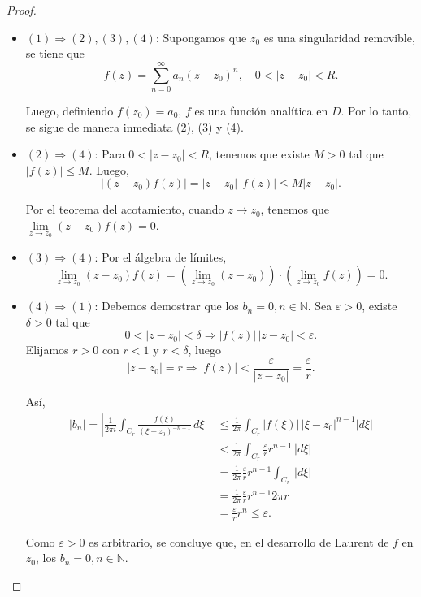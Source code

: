 \begin{proof}
\ 

\begin{itemize}
    \item  $(1) \Rightarrow (2), (3), (4)$: Supongamos que $z_0$ es una singularidad removible, se tiene que
    $$f(z) = \sum_{n=0}^{\infty} a_n (z-z_0)^n, \quad 0 < |z-z_0| < R.$$
    
    Luego, definiendo $f(z_0) = a_0$, $f$ es una función analítica en $D$. Por lo tanto, se sigue de manera inmediata (2), (3) y (4).
    
    \item $(2) \Rightarrow (4)$: Para  $0 < |z-z_0| < R$, tenemos que existe $M > 0$ tal que $|f(z)| \leq M $. Luego,
    $$|(z-z_0) f(z)| = |z-z_0| \,|f(z)| \leq M |z-z_0|.$$
    
    Por el teorema del acotamiento, cuando $z \to z_0$, tenemos que $\lim\limits_{z\to z_0} (z-z_0) f(z) = 0$.
    
    \item $(3) \Rightarrow (4)$: Por el álgebra de límites,
    $$\lim_{z\to z_0} (z-z_0) f(z) = \left( \lim_{z\to z_0} (z-z_0)  \right) \cdot \left(\lim_{z\to z_0} f(z) \right) = 0.$$
    
    \item $(4) \Rightarrow (1)$: Debemos demostrar que los $b_n = 0, n \in \mathbb{N}$. Sea $\varepsilon > 0$, existe $\delta > 0$ tal que
    $$0 < |z-z_0| < \delta \Rightarrow |f(z)| \,|z-z_0| < \varepsilon.$$
        Elijamos $r > 0$ con $r < 1$ y $r < \delta$, luego
    $$|z-z_0| = r \Rightarrow |f(z)| < \frac{\varepsilon}{|z-z_0|} = \frac{\varepsilon}{r}.$$
    
    Así,
    \begin{align*}
        |b_n| = \left| \frac{1}{2\pi i} \int_{C_r} \frac{f(\xi)}{(\xi-z_0)^{-n+1}} \,d\xi\right| &\leq \frac{1}{2\pi} \int_{C_r} |f(\xi)| \,|\xi-z_0|^{n-1} |d\xi| \\
        &< \frac{1}{2\pi} \int_{C_r} \frac{\varepsilon}{r} r^{n-1} \,|d\xi| \\
        &= \frac{1}{2\pi}\frac{\varepsilon}{r} r^{n-1} \int_{C_r}  \,|d\xi| \\
        &=  \frac{1}{2\pi}\frac{\varepsilon}{r} r^{n-1} 2\pi r \\
        &= \frac{\varepsilon}{r}r^n \leq \varepsilon.
    \end{align*}

Como $\varepsilon > 0$ es arbitrario, se concluye que, en el desarrollo de Laurent de $f$ en $z_0$, los $b_n = 0, n\in \mathbb{N}$.
\end{itemize}
\end{proof}

